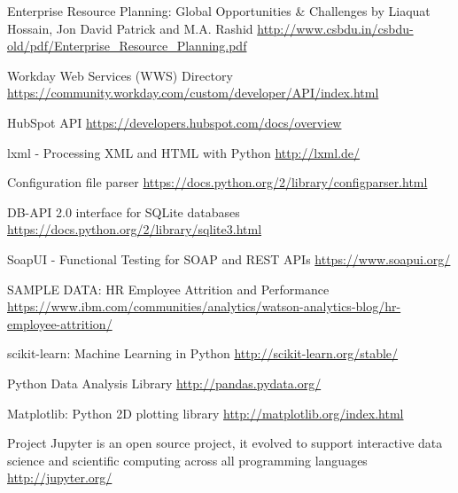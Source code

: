 \begin{thebibliography}{9}
	
	
	Enterprise Resource Planning: Global Opportunities \& Challenges
	by Liaquat Hossain, Jon David Patrick and M.A. Rashid 
	\url{http://www.csbdu.in/csbdu-old/pdf/Enterprise_Resource_Planning.pdf}
	 
	Workday Web Services (WWS) Directory
	\url{https://community.workday.com/custom/developer/API/index.html}
	
	HubSpot API
	\url{https://developers.hubspot.com/docs/overview}
	
	lxml - Processing XML and HTML with Python
	\url{http://lxml.de/}
	 
	 
	Configuration file parser
	\url{https://docs.python.org/2/library/configparser.html}
	 
	
	DB-API 2.0 interface for SQLite databases
	\url{https://docs.python.org/2/library/sqlite3.html}
	
	SoapUI - Functional Testing for SOAP and REST APIs
	\url{https://www.soapui.org/}
	
	
	SAMPLE DATA: HR Employee Attrition and Performance
	\url{https://www.ibm.com/communities/analytics/watson-analytics-blog/hr-employee-attrition/}
	

	scikit-learn: Machine Learning in Python
	\url{http://scikit-learn.org/stable/}
	
	Python Data Analysis Library
	\url{http://pandas.pydata.org/}
	
	Matplotlib: Python 2D plotting library
	\url{http://matplotlib.org/index.html}
		
	Project Jupyter is an open source project, it evolved to support interactive data science and scientific computing across all programming languages
	\url{http://jupyter.org/}
	
	
	
	
\end{thebibliography}